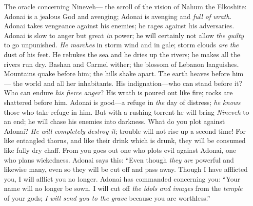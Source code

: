 
\begin{biblechapter} %
 The oracle concerning Nineveh— 
the scroll of the vision of Nahum the Elkoshite:
 Adonai is a jealous God and avenging; 
Adonai is avenging and \textit{full of wrath}. 
Adonai takes vengeance against his enemies; 
he rages against his adversaries.
\verse Adonai is slow to anger but great \textit{in} power; 
he will certainly not allow \textit{the guilty} to go unpunished. 
\textit{He marches} in storm wind and in gale; 
storm clouds \textit{are the} dust of his feet.
\verse He rebukes the sea and he dries up the rivers; 
he makes all the rivers run dry. 
Bashan and Carmel wither; 
the blossom of Lebanon languishes.
\verse Mountains quake before him; 
the hills shake apart. 
The earth heaves before him— 
the world and all her inhabitants.
\verse His indignation—who can stand before it? 
Who can endure \textit{his fierce anger}? 
His wrath is poured out like fire; 
rocks are shattered before him.
\verse Adonai is good—a refuge in \textit{the} day of distress; 
\textit{he knows} those who take refuge in him.
\verse But with a rushing torrent he will bring \textit{Nineveh} to an end; 
he will chase his enemies into darkness.
 What do you plot against Adonai? 
\textit{He will completely destroy it}; 
trouble will not rise up a second time!
\verse For like entangled thorns, 
and like their drink which is drunk, 
they will be consumed like fully dry chaff.
\verse From you goes out one who plots evil against Adonai, 
one who plans wickedness.
 Adonai says this:
\verse “Even though \textit{they are} powerful and likewise many, 
even so they will be cut off and pass away. 
Though I have afflicted you, 
I will afflict you no longer.
\verse Adonai has commanded concerning you:
\verse “Your name will no longer be sown. 
I will cut off \textit{the idols and images} from the \textit{temple} of your gods; 
\textit{I will send you to the grave} because you are worthless.”
\end{biblechapter}

